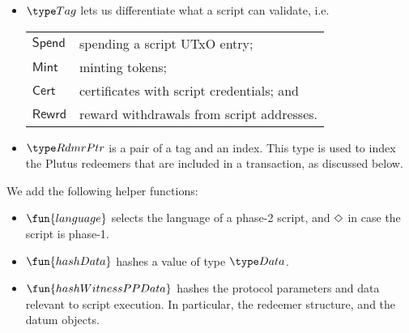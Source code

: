 \begin{itemize}
  \item $\Tag$ lets us differentiate what a script
  can validate, i.e. \\
  \begin{tabular}{l@{~to validate~}l}
  $\mathsf{Spend}$ & spending a script UTxO entry; \\
  $\mathsf{Mint}$ & minting tokens; \\
  $\mathsf{Cert}$  & certificates with script credentials; and  \\
  $\mathsf{Rewrd}$ & reward withdrawals from script addresses.
  \end{tabular}

  \item $\RdmrPtr$ is a pair of a tag and an index. This type is
  used to index the Plutus redeemers that are included in a transaction, as discussed
  below.

\end{itemize}

We add the following helper functions:

\begin{itemize}
  \item $\fun{language}$ selects the language of a phase-2 script, and $\Diamond$ in case
  the script is phase-1.
  \item $\fun{hashData}$ hashes a value of type $\Data$.
  \item $\fun{hashWitnessPPData}$ hashes the protocol parameters and data relevant to script execution.
  In particular, the redeemer structure, and the datum objects.
\end{itemize}

